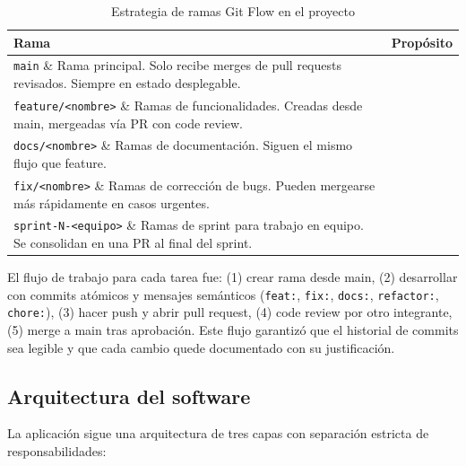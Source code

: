 \documentclass[11pt,a4paper]{article}
\begin{document}
\begin{table}[htbp]
\centering
\small
\caption{Estrategia de ramas Git Flow en el proyecto}
\begin{tabularx}{\textwidth}{lX}
\toprule
\textbf{Rama} & \textbf{Propósito} \\
\midrule
\texttt{main} \& Rama principal. Solo recibe merges de pull requests revisados. Siempre en estado desplegable. \\
\texttt{feature/<nombre>} \& Ramas de funcionalidades. Creadas desde main, mergeadas vía PR con code review. \\
\texttt{docs/<nombre>} \& Ramas de documentación. Siguen el mismo flujo que feature. \\
\texttt{fix/<nombre>} \& Ramas de corrección de bugs. Pueden mergearse más rápidamente en casos urgentes. \\
\texttt{sprint-N-<equipo>} \& Ramas de sprint para trabajo en equipo. Se consolidan en una PR al final del sprint. \\
\bottomrule
\end{tabularx}
\end{table}

El flujo de trabajo para cada tarea fue: (1) crear rama desde main, (2) desarrollar con commits atómicos y mensajes semánticos (\texttt{feat:}, \texttt{fix:}, \texttt{docs:}, \texttt{refactor:}, \texttt{chore:}), (3) hacer push y abrir pull request, (4) code review por otro integrante, (5) merge a main tras aprobación. Este flujo garantizó que el historial de commits sea legible y que cada cambio quede documentado con su justificación.

\subsection{Arquitectura del software}
La aplicación sigue una arquitectura de tres capas con separación estricta de responsabilidades:
\end{document}
